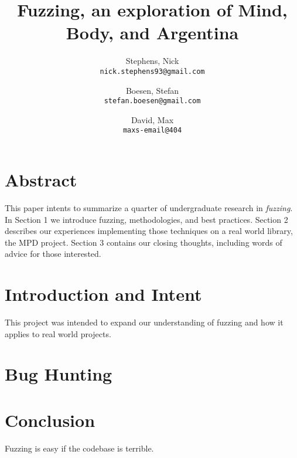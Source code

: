 \documentclass[10pt]{article}
\author{
  Stephens, Nick\\
  \texttt{nick.stephens93@gmail.com}
  \and
  Boesen, Stefan\\
  \texttt{stefan.boesen@gmail.com}
  \and
  David, Max\\
  \texttt{maxs-email@404}
}
\title{Fuzzing, an exploration of Mind, Body, and Argentina}
\begin{document}
  \maketitle

\section*{Abstract}
This paper intents to summarize a quarter of undergraduate research in \emph{fuzzing}. In Section 1 we introduce fuzzing, methodologies, and best practices. Section 2 describes our experiences implementing those techniques on a real world library, the MPD project. Section 3 contains our closing thoughts, including words of advice for those interested.

\section{Introduction and Intent}
This project was intended to expand our understanding of fuzzing and how it applies to real world projects.
\section{Bug Hunting}

\section{Conclusion}
Fuzzing is easy if the codebase is terrible.
\end{document}
